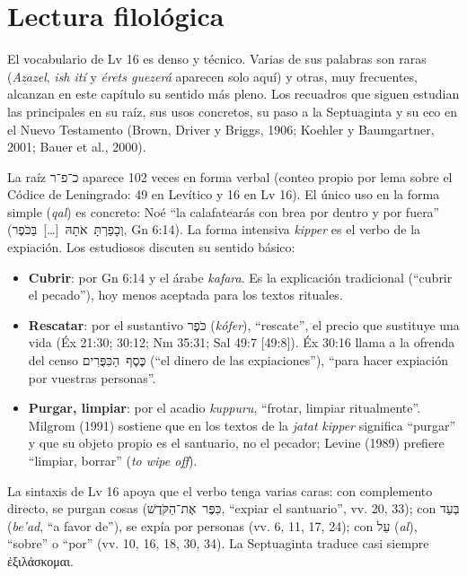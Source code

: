 \documentclass[11pt,letterpaper]{article}
\newcommand{\heb}[1]{\mbox{\foreignlanguage{hebrew}{#1}}}
\newcommand{\grc}[1]{\foreignlanguage{ancientgreek}{#1}}
\begin{document}
\section{Lectura filológica}

El vocabulario de Lv 16 es denso y técnico. Varias de sus palabras son raras (\emph{Azazel}, \emph{ish ití} y \emph{érets guezerá} aparecen solo aquí) y otras, muy frecuentes, alcanzan en este capítulo su sentido más pleno. Los recuadros que siguen estudian las principales en su raíz, sus usos concretos, su paso a la Septuaginta y su eco en el Nuevo Testamento (Brown, Driver y Briggs, 1906; Koehler y Baumgartner, 2001; Bauer et al., 2000).

\begin{filologia}[\heb{כִּפֶּר} \emph{kipper}]
La raíz \heb{כ־פ־ר} aparece 102 veces en forma verbal (conteo propio por lema sobre el Códice de Leningrado: 49 en Levítico y 16 en Lv 16). El único uso en la forma simple (\emph{qal}) es concreto: Noé ``la calafatearás con brea por dentro y por fuera'' (\heb{וְכָפַרְתָּ אֹתָהּ \foreignlanguage{spanish}{[\ldots]} בַּכֹּפֶר}, Gn 6:14). La forma intensiva \emph{kipper} es el verbo de la expiación. Los estudiosos discuten su sentido básico:
\begin{itemize}\setlength{\itemsep}{0pt}
\item \textbf{Cubrir}: por Gn 6:14 y el árabe \emph{kafara}. Es la explicación tradicional (``cubrir el pecado''), hoy menos aceptada para los textos rituales.
\item \textbf{Rescatar}: por el sustantivo \heb{כֹּפֶר} (\emph{kófer}), ``rescate'', el precio que sustituye una vida (Éx 21:30; 30:12; Nm 35:31; Sal 49:7 [49:8]). Éx 30:16 llama a la ofrenda del censo \heb{כֶּסֶף הַכִּפֻּרִים} (``el dinero de las expiaciones''), ``para hacer expiación por vuestras personas''.
\item \textbf{Purgar, limpiar}: por el acadio \emph{kuppuru}, ``frotar, limpiar ritualmente''. Milgrom (1991) sostiene que en los textos de la \emph{jatat} \emph{kipper} significa ``purgar'' y que su objeto propio es el santuario, no el pecador; Levine (1989) prefiere ``limpiar, borrar'' (\emph{to wipe off}).
\end{itemize}
La sintaxis de Lv 16 apoya que el verbo tenga varias caras: con complemento directo, se purgan cosas (\heb{כִּפֶּר אֶת־הַקֹּדֶשׁ}, ``expiar el santuario'', vv. 20, 33); con \heb{בְּעַד} (\emph{be'ad}, ``a favor de''), se expía por personas (vv. 6, 11, 17, 24); con \heb{עַל} (\emph{al}), ``sobre'' o ``por'' (vv. 10, 16, 18, 30, 34). La Septuaginta traduce casi siempre \grc{ἐξιλάσκομαι}.
\end{filologia}
\end{document}
